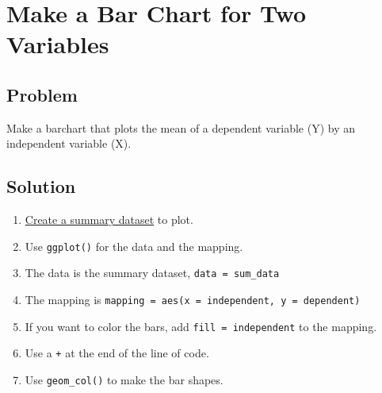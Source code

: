\documentclass[
]{book}
\providecommand{\tightlist}{%
  \setlength{\itemsep}{0pt}\setlength{\parskip}{0pt}}
\begin{document}
\hypertarget{barchart2}{%
\section{Make a Bar Chart for Two Variables}\label{barchart2}}

\hypertarget{problem-42}{%
\subsection{Problem}\label{problem-42}}

Make a barchart that plots the mean of a dependent variable (Y) by an independent variable (X).

\hypertarget{solution-41}{%
\subsection{Solution}\label{solution-41}}

\begin{enumerate}
\def\labelenumi{\arabic{enumi}.}
\tightlist
\item
  \protect\hyperlink{sum}{Create a summary dataset} to plot.
\item
  Use \texttt{ggplot()} for the data and the mapping.
\item
  The data is the summary dataset, \texttt{data\ =\ sum\_data}
\item
  The mapping is \texttt{mapping\ =\ aes(x\ =\ independent,\ y\ =\ dependent)}
\item
  If you want to color the bars, add \texttt{fill\ =\ independent} to the mapping.
\item
  Use a \texttt{+} at the end of the line of code.
\item
  Use \texttt{geom\_col()} to make the bar shapes.
\end{enumerate}
\end{document}
